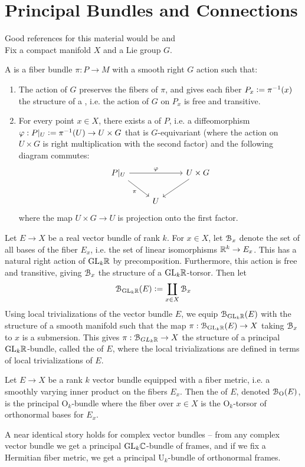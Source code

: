 %
\section{Principal Bundles and Connections}
%
Good references for this material would be \cite{KobNom} and \cite{Tu} \\

Fix a compact manifold $X$ and a Lie group $G$.
%
\begin{defn}
A  is a fiber bundle $\pi : P \to M$ with a smooth
right $G$ action such that:
\begin{enumerate}
  \item The action of $G$ preserves the fibers of $\pi$, and gives each fiber
  $P_x \vcentcolon= \pi^{-1}(x)$ the structure of a , i.e. the
  action of $G$ on $P_x$ is free and transitive.
  \item For every point $x \in X$, there exists a  of
  $P$, i.e. a diffeomorphism $\varphi : P\vert_U \vcentcolon= \pi^{-1}(U) \to U \times G$
  that is $G$-equivariant (where the action on $U \times G$ is right multiplication
  with the second factor) and the following diagram commutes:
  \[\begin{tikzcd}
  P\vert_U \ar[rr, "\varphi"] \ar[dr, "\pi"'] && U \times G \ar[dl] \\
  & U
  \end{tikzcd}\]
  where the map $U\times G \to U$ is projection onto the first factor.
\end{enumerate}
\end{defn}
%
\begin{exmp}
Let $E \to X$ be a real vector bundle of rank $k$. For $x \in X$, let $\mathcal{B}_x$
denote the set of all bases of the fiber $E_x$, i.e. the set of linear isomorphisms
$\mathbb{R}^k \to E_x$. This has a natural right action of $\mathrm{GL}_k\mathbb{R}$ by precomposition.
Furthermore, this action is free and transitive, giving $\mathcal{B}_x$ the structure
of a $\mathrm{GL}_k\mathbb{R}$-torsor. Then let
\[
\mathcal{B}_{\mathrm{GL}_k\mathbb{R}}(E) \vcentcolon= \coprod_{x \in X}\mathcal{B}_x
\]
Using local trivializations of the vector bundle $E$, we equip $\mathcal{B}_{\mathrm{GL}_k\mathbb{R}}(E)$
with the structure of a smooth manifold such that the map
$\pi : \mathcal{B}_{\mathrm{GL}_k\mathbb{R}}(E) \to X$ taking $\mathcal{B}_x$ to $x$ is a submersion. This gives
$\pi : \mathcal{B}_{GL_k\mathbb{R}} \to X$ the structure of a principal $\mathrm{GL}_k\mathbb{R}$-bundle, called
the  of $E$,  where the local trivializations are defined in terms of
local trivializations of $E$.
\end{exmp}
%
\begin{exmp}
Let $E \to X$ be a rank $k$ vector bundle equipped with a fiber metric, i.e. a
smoothly  varying inner product on the fibers $E_x$. Then the
 of $E$, denoted $\mathcal{B}_{\mathrm{O}}(E)$, is the principal
$\mathrm{O}_k$-bundle where the fiber over $x \in X$ is the $\mathrm{O}_k$-torsor
of orthonormal bases for $E_x$.
\end{exmp}
%
A near identical story holds for complex vector bundles -- from any complex
vector bundle we get a principal $\mathrm{GL}_k\mathbb{C}$-bundle of frames, and if
we fix a Hermitian fiber metric, we get a principal $\mathrm{U}_k$-bundle of
orthonormal frames. \\

